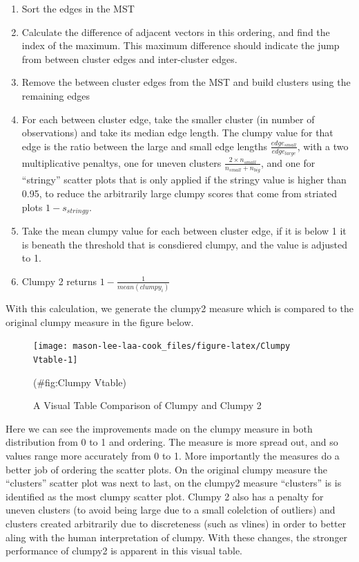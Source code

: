 \begin{enumerate}
\def\labelenumi{\arabic{enumi}.}
\tightlist
\item
  Sort the edges in the MST
\item
  Calculate the difference of adjacent vectors in this ordering, and
  find the index of the maximum. This maximum difference should indicate
  the jump from between cluster edges and inter-cluster edges.
\item
  Remove the between cluster edges from the MST and build clusters using
  the remaining edges
\item
  For each between cluster edge, take the smaller cluster (in number of
  observations) and take its median edge length. The clumpy value for
  that edge is the ratio between the large and small edge lengths
  \(\frac{edge_{small}}{edge_{large}}\), with a two multiplicative
  penaltys, one for uneven clusters
  \(\frac{2\times n_{small}}{n_{small}+n_{big}}\), and one for
  ``stringy'' scatter plots that is only applied if the stringy value is
  higher than 0.95, to reduce the arbitrarily large clumpy scores that
  come from striated plots \(1-s_{stringy}\).
\item
  Take the mean clumpy value for each between cluster edge, if it is
  below 1 it is beneath the threshold that is consdiered clumpy, and the
  value is adjusted to 1.
\item
  Clumpy 2 returns \(1-\frac{1}{mean(clumpy_i)}\)
\end{enumerate}

With this calculation, we generate the clumpy2 measure which is compared
to the original clumpy measure in the figure below.

\begin{Schunk}
\begin{figure}
\texttt{[image: mason-lee-laa-cook\_files/figure-latex/Clumpy Vtable-1]} \caption[A Visual Table Comparison of Clumpy and Clumpy 2]{A Visual Table Comparison of Clumpy and Clumpy 2}(\#fig:Clumpy Vtable)
\end{figure}
\end{Schunk}

Here we can see the improvements made on the clumpy measure in both
distribution from 0 to 1 and ordering. The measure is more spread out,
and so values range more accurately from 0 to 1. More importantly the
measures do a better job of ordering the scatter plots. On the original
clumpy measure the ``clusters'' scatter plot was next to last, on the
clumpy2 measure ``clusters'' is is identified as the most clumpy scatter
plot. Clumpy 2 also has a penalty for uneven clusters (to avoid being
large due to a small colelction of outliers) and clusters created
arbitrarily due to discreteness (such as vlines) in order to better
aling with the human interpretation of clumpy. With these changes, the
stronger performance of clumpy2 is apparent in this visual table.

